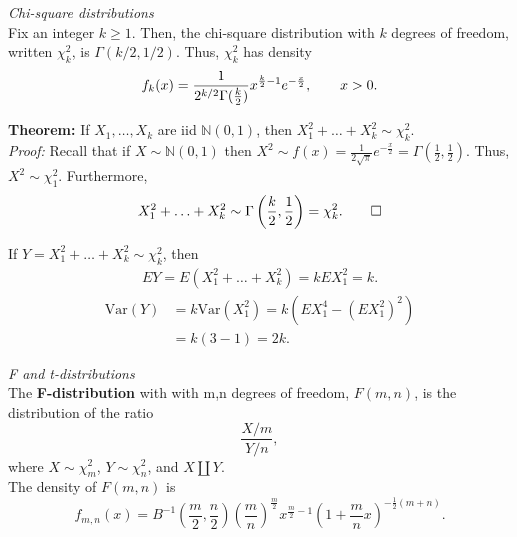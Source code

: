 \documentclass[12pt,oneside]{article}
\begin{document}
\noindent \emph{Chi-square distributions}\\

\noindent Fix an integer $k \geq 1$.  Then, the chi-square distribution with $k$ degrees of freedom, written $\chi^2_k$, is $\Gamma(k/2,1/2)$.  Thus, $\chi^2_k$ has density
\[f_k(x) = \frac{1}{2^{k/2} \Gamma(\frac{k}{2})} x^{\frac{k}{2}-1}e^{-\frac{x}{2}} , \hspace{20 pt} x>0.\]

\noindent \textbf{Theorem:} If $X_1,\hdots,X_k$ are iid $\mathbb{N}(0,1)$, then $X_1^2+\hdots+X_k^2 \sim \chi_k^2$.\\

\noindent\emph{Proof:}  Recall that if $X \sim \mathbb{N}(0,1)$ then $X^2 \sim f(x) = \frac{1}{2 \sqrt{\pi}} e^{-\frac{x}{2}} = \Gamma(\frac{1}{2},\frac{1}{2})$.  Thus, $X^2 \sim \chi_1^2$.  Furthermore,
\[X_1^2+\hdots+X_k^2 \sim \Gamma\left(\frac{k}{2},\frac{1}{2}\right) = \chi_k^2 . \hspace{20 pt} \Box \]

\noindent If $Y=X_1^2+\hdots+X_k^2 \sim \chi_k^2$, then
\begin{align}
E Y= E(X_1^2+\hdots+X_k^2) = k EX_1^2 = k. \nonumber
\end{align}
\begin{align}
\mbox{Var}(Y) &= k \mbox{Var}(X_1^2) = k(E X_1^4-(EX_1^2)^2) \nonumber \\
&= k(3-1) = 2k \nonumber.
\end{align}

\noindent \emph{F and t-distributions}\\

\noindent The \textbf{F-distribution} with with m,n degrees of freedom, $F(m,n)$, is the distribution of the ratio
\[\frac{X/m}{Y/n},\]
where $X \sim \chi_m^2$, $Y \sim \chi_n^2$, and $X \coprod Y$. \\




The density of $F(m,n)$  is
\[f_{m,n}(x) = B^{-1} \left(\frac{m}{2}, \frac{n}{2}\right) \left(\frac{m}{n}\right)^{\frac{m}{2}} x^{\frac{m}{2}-1}\left(1+\frac{m}{n}x\right)^{-\frac{1}{2} (m+n)}. \]
\end{document}
